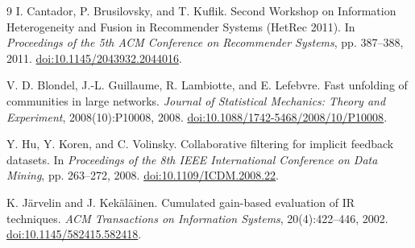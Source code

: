 \documentclass[10pt,a4paper]{article}
\begin{document}
\begin{thebibliography}{9}
I. Cantador, P. Brusilovsky, and T. Kuflik.
Second Workshop on Information Heterogeneity and Fusion in Recommender Systems (HetRec 2011).
In \emph{Proceedings of the 5th ACM Conference on Recommender Systems}, pp. 387--388, 2011.
\href{https://doi.org/10.1145/2043932.2044016}{doi:10.1145/2043932.2044016}.

V. D. Blondel, J.-L. Guillaume, R. Lambiotte, and E. Lefebvre.
Fast unfolding of communities in large networks.
\emph{Journal of Statistical Mechanics: Theory and Experiment}, 2008(10):P10008, 2008.
\href{https://doi.org/10.1088/1742-5468/2008/10/P10008}{doi:10.1088/1742-5468/2008/10/P10008}.

Y. Hu, Y. Koren, and C. Volinsky.
Collaborative filtering for implicit feedback datasets.
In \emph{Proceedings of the 8th IEEE International Conference on Data Mining}, pp. 263--272, 2008.
\href{https://doi.org/10.1109/ICDM.2008.22}{doi:10.1109/ICDM.2008.22}.

K. J\"arvelin and J. Kek\"al\"ainen.
Cumulated gain-based evaluation of IR techniques.
\emph{ACM Transactions on Information Systems}, 20(4):422--446, 2002.
\href{https://doi.org/10.1145/582415.582418}{doi:10.1145/582415.582418}.

\end{thebibliography}
\end{document}

